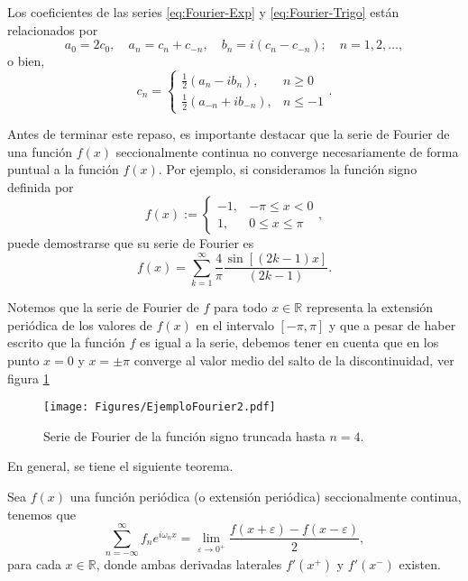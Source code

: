 Los coeficientes de las series \eqref{eq:Fourier-Exp} y \eqref{eq:Fourier-Trigo} están relacionados por 
\begin{equation}
a_0 = 2c_0,\quad a_n = c_n + c_{-n}, \quad b_n = i(c_n - c_{-n}); \quad n = 1,2, \dots,  
\end{equation}
o bien, 
\begin{equation}
    c_n = \left\{ \begin{array}{cl}
        \frac{1}{2} (a_n - ib_n), & n \geq 0  \\
    \frac{1}{2}(a_{-n} + i b_{-n}),     & n  \leq -1 
    \end{array} \right. . 
\end{equation}

Antes de terminar este repaso, es importante destacar que la serie de Fourier de una función $f(x)$ seccionalmente continua no converge necesariamente de forma puntual a la función $f(x)$. Por ejemplo, si consideramos la función signo definida por
\begin{equation}
 f(x) := \left\{ \begin{array}{cc}
     -1,& - \pi \leq x < 0  \\
     1,&   0 \leq x \leq \pi
\end{array} \right.,  
\end{equation}
puede demostrarse que su serie de Fourier es 
\begin{equation}
 f(x) = \sum_{k=1}^{\infty} \frac{4}{\pi} \frac{\sin[(2k-1)x]}{(2k-1)}.   
\end{equation}

Notemos que la serie de Fourier de $f$ para todo $x\in \mathbb{R}$ representa la extensión periódica de los valores de $f(x)$ en el intervalo $[-\pi,\pi]$ y que a pesar de haber escrito que la función $f$ es igual a la serie, debemos tener en cuenta que en los punto $x = 0$ y $x = \pm \pi$ converge al valor medio del salto de la discontinuidad, ver figura \ref{fig:EjemploFourier2}

\begin{figure}[H]
    \centering
    \texttt{[image: Figures/EjemploFourier2.pdf]}
    \caption{Serie de Fourier de la función signo truncada hasta $n = 4$.}
     \label{fig:EjemploFourier2}
\end{figure}


En general, se tiene el siguiente teorema.

\begin{teorema} \label{Puntual}
Sea $f(x)$ una función periódica (o extensión periódica) seccionalmente continua, tenemos que
\begin{equation}
    \sum_{n = - \infty}^{\infty} f_n e^{i \omega_n x} = \lim_{\varepsilon \to 0^{+}} \frac{f(x + \varepsilon) - f(x - \varepsilon)}{2},
\end{equation}
\vspace{-0.05cm}
para cada $x \in \mathbb{R}$, donde ambas derivadas laterales $f'(x^+)$ y $f'(x^-)$ existen.
\end{teorema}

